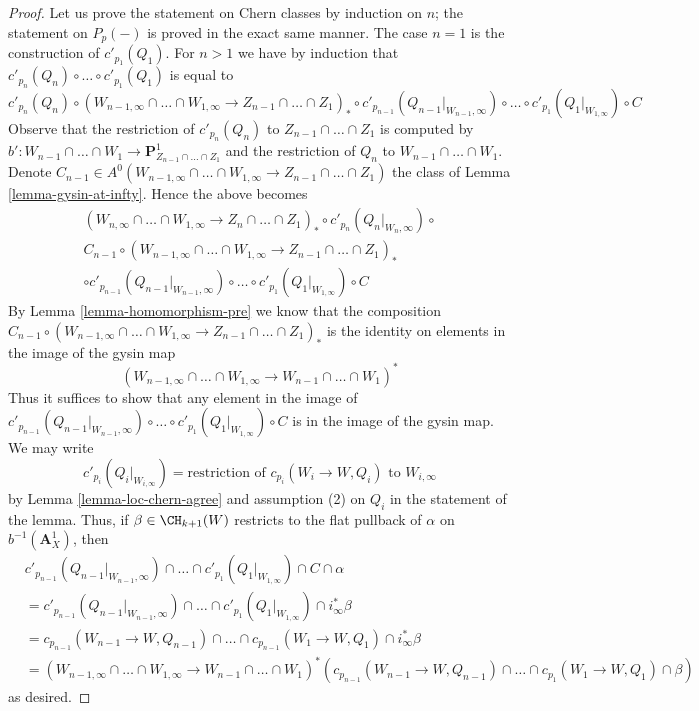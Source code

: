\begin{proof}
Let us prove the statement on Chern classes by induction on $n$;
the statement on $P_p(-)$ is proved in the exact same manner.
The case $n = 1$ is the construction of $c'_{p_1}(Q_1)$.
For $n > 1$ we have by induction that
$c'_{p_n}(Q_n) \circ \ldots \circ c'_{p_1}(Q_1)$ is equal to
$$
c'_{p_n}(Q_n) \circ
(W_{n - 1, \infty} \cap \ldots \cap W_{1, \infty} \to
Z_{n - 1} \cap \ldots \cap Z_1)_* \circ
c'_{p_{n - 1}}(Q_{n - 1}|_{W_{n - 1}, \infty}) \circ \ldots \circ
c'_{p_1}(Q_1|_{W_{1, \infty}})
\circ C
$$
Observe that the restriction of $c'_{p_n}(Q_n)$ to
$Z_{n - 1} \cap \ldots \cap Z_1$ is computed by
$b' : W_{n - 1} \cap \ldots \cap W_1 \to
\mathbf{P}^1_{Z_{n - 1} \cap \ldots \cap Z_1}$
and the restriction of $Q_n$ to $W_{n - 1} \cap \ldots \cap W_1$.
Denote $C_{n - 1} \in A^0(W_{n - 1, \infty} \cap \ldots \cap W_{1, \infty} \to
Z_{n - 1} \cap \ldots \cap Z_1)$ the class of Lemma \ref{lemma-gysin-at-infty}.
Hence the above becomes
\begin{align*}
(W_{n, \infty} \cap \ldots \cap W_{1, \infty} \to
Z_n \cap \ldots \cap Z_1)_* \circ
c'_{p_n}(Q_n|_{W_n, \infty}) \circ \\
C_{n - 1} \circ
(W_{n - 1, \infty} \cap \ldots \cap W_{1, \infty} \to
Z_{n - 1} \cap \ldots \cap Z_1)_* \\
\circ
c'_{p_{n - 1}}(Q_{n - 1}|_{W_{n - 1}, \infty}) \circ \ldots \circ
c'_{p_1}(Q_1|_{W_{1, \infty}})
\circ C
\end{align*}
By Lemma \ref{lemma-homomorphism-pre}
we know that the composition
$C_{n - 1} \circ (W_{n - 1, \infty} \cap \ldots \cap W_{1, \infty} \to
Z_{n - 1} \cap \ldots \cap Z_1)_*$
is the identity on elements in the image of the gysin map
$$
(W_{n - 1, \infty} \cap \ldots \cap W_{1, \infty} \to
W_{n - 1} \cap \ldots \cap W_1)^*
$$
Thus it suffices to show that any element in the image of
$c'_{p_{n - 1}}(Q_{n - 1}|_{W_{n - 1}, \infty}) \circ \ldots \circ
c'_{p_1}(Q_1|_{W_{1, \infty}}) \circ C$
is in the image of the gysin map. We may write
$$
c'_{p_i}(Q_i|_{W_{i, \infty}}) = \text{restriction of } c_{p_i}(W_i \to W, Q_i)
\text{ to } W_{i, \infty}
$$
by Lemma \ref{lemma-loc-chern-agree} and assumption (2) on $Q_i$
in the statement of the lemma. Thus, if $\beta \in \CH_{k + 1}(W)$
restricts to the flat pullback of $\alpha$ on $b^{-1}(\mathbf{A}^1_X)$,
then
\begin{align*}
& c'_{p_{n - 1}}(Q_{n - 1}|_{W_{n - 1}, \infty}) \cap \ldots \cap
c'_{p_1}(Q_1|_{W_{1, \infty}})
\cap C \cap \alpha \\
& =
c'_{p_{n - 1}}(Q_{n - 1}|_{W_{n - 1}, \infty}) \cap \ldots \cap
c'_{p_1}(Q_1|_{W_{1, \infty}})
\cap i_\infty^* \beta \\
& =
c_{p_{n - 1}}(W_{n - 1} \to W, Q_{n - 1}) \cap \ldots \cap
c_{p_{n - 1}}(W_1 \to W, Q_1) \cap i_\infty^* \beta \\
& =
(W_{n - 1, \infty} \cap \ldots \cap W_{1, \infty} \to
W_{n - 1} \cap \ldots \cap W_1)^*
\left(c_{p_{n - 1}}(W_{n - 1} \to W, Q_{n - 1}) \cap \ldots \cap
c_{p_1}(W_1 \to W, Q_1) \cap \beta\right)
\end{align*}
as desired.
\end{proof}

